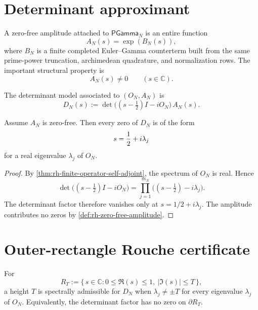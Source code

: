 \section{Determinant approximant}
\label{sec:rh-determinant-approximant}

\begin{definition}
\label{def:rh-zero-free-amplitude}
A zero-free amplitude attached to $\mathsf{PGamma}_N$ is an entire function
$$
A_N(s)=\exp(B_N(s)),
$$
where $B_N$ is a finite completed Euler--Gamma counterterm built from the same
prime-power truncation, archimedean quadrature, and normalization rows.  The
important structural property is
$$
A_N(s)\ne0
\qquad(s\in\mathbb C).
$$
\end{definition}

\begin{definition}
\label{def:rh-finite-hermitian-determinant-model}
The determinant model associated to $(O_N,A_N)$ is
$$
D_N(s)
:=
\det\bigl((s-\tfrac12)I-iO_N\bigr)\,A_N(s).
$$
\end{definition}

\begin{theorem}
\label{thm:rh-model-zeros-on-critical-line}
Assume $A_N$ is zero-free.  Then every zero of $D_N$ is of the form
$$
s={1\over2}+i\lambda_j
$$
for a real eigenvalue $\lambda_j$ of $O_N$.
\end{theorem}

\begin{proof}
By \autoref{thm:rh-finite-operator-self-adjoint}, the spectrum of $O_N$ is
real.  Hence
$$
\det\bigl((s-\tfrac12)I-iO_N\bigr)
=
\prod_{j=1}^{m_N}\bigl((s-\tfrac12)-i\lambda_j\bigr).
$$
The determinant factor therefore vanishes only at
$s=1/2+i\lambda_j$.  The amplitude contributes no zeros by
\autoref{def:rh-zero-free-amplitude}.
\end{proof}

\section{Outer-rectangle Rouche certificate}
\label{sec:rh-outer-rectangle-rouche-certificate}

\begin{definition}
\label{def:rh-spectrally-admissible-height}
For
$$
R_T:=\{\,s\in\mathbb C:0\le\Re(s)\le1,\ |\Im(s)|\le T\,\},
$$
a height $T$ is spectrally admissible for $D_N$ when
$\lambda_j\ne\pm T$ for every eigenvalue $\lambda_j$ of $O_N$.  Equivalently,
the determinant factor has no zero on $\partial R_T$.
\end{definition}

